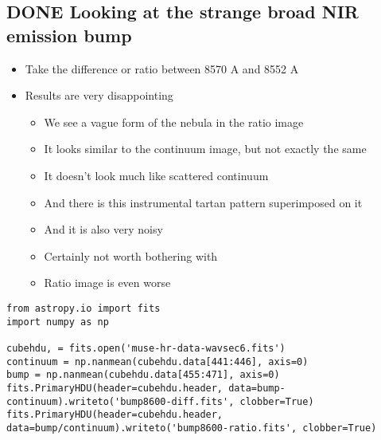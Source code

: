 \documentclass[11pt]{article}
\begin{document}
\subsection{{\bfseries\sffamily DONE} Looking at the strange broad NIR emission bump}
\label{sec:orgheadline7}
\begin{itemize}
\item Take the difference or ratio between 8570 A and 8552 A
\item Results are very disappointing
\begin{itemize}
\item We see a vague form of the nebula in the ratio image
\item It looks similar to the continuum image, but not exactly the same
\item It doesn't look much like scattered continuum
\item And there is this instrumental tartan pattern superimposed on it
\item And it is also very noisy
\item Certainly not worth bothering with
\item Ratio image is even worse
\end{itemize}
\end{itemize}
\begin{verbatim}
from astropy.io import fits
import numpy as np

cubehdu, = fits.open('muse-hr-data-wavsec6.fits')
continuum = np.nanmean(cubehdu.data[441:446], axis=0)
bump = np.nanmean(cubehdu.data[455:471], axis=0)
fits.PrimaryHDU(header=cubehdu.header, data=bump-continuum).writeto('bump8600-diff.fits', clobber=True)
fits.PrimaryHDU(header=cubehdu.header, data=bump/continuum).writeto('bump8600-ratio.fits', clobber=True)
\end{verbatim}
\end{document}
